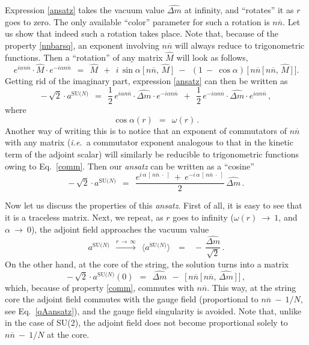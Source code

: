\documentclass[12pt]{article}
\def\beq{\begin{equation}}
\def\eeq{\end{equation}}
\newcommand{\ov}{\overline}
\newcommand{\aN}{a^\text{SU($N$)}}
\newcommand{\nnbar}{n\ov{n}}
\newcommand{\dm}{\hat{{\scriptstyle \Delta} m}}
\newcommand{\ie}{{\it i.e.}~}
\newcommand{\ansatz}{{\it ansatz} }
\begin{document}
	Expression \eqref{ansatz} takes the vacuum value $ \dm $ at infinity, and 
	``rotates'' it as $ r $ goes to zero.
	The only available ``color'' parameter for such a rotation is $ \nnbar $.
	Let us show that indeed such a rotation takes place.
	Note that, because of the property \eqref{nnbarsq}, an exponent involving $ \nnbar $
	will always reduce to trigonometric functions.
	Then a ``rotation'' of any matrix $ \hat{M} $ will look as follows,
\beq
	e^{i \alpha \nnbar} \cdot \hat{M} \cdot e^{- i \alpha \nnbar}    ~~=~~
	\hat{M}  ~~+~~  i\, \sin \alpha \: \big[\, \nnbar,\, \hat{M} \,\big]
	~~-~~  ( 1 ~-~ \cos \alpha )\, \Big[\, \nnbar\, \big[\, \nnbar,\, \hat{M} \,\big] \,\Big].
\eeq
	Getting rid of the imaginary part, expression \eqref{ansatz} can then be written as
\beq
\label{rotation}
	-\, \sqrt{2} \cdot \aN    ~~=~~    
	\frac{1}{2}\, e^{i \alpha \nnbar} \cdot \dm \cdot e^{- i \alpha \nnbar}  ~~+~~
	\frac{1}{2}\, e^{- i \alpha \nnbar} \cdot \dm \cdot e^{i \alpha \nnbar}\,,
\eeq
	where 
\beq
	\cos\alpha(r)    ~~=~~    \omega(r)\,.
\eeq
	Another way of writing this is to notice that an exponent of commutators of $ \nnbar $
	with any matrix (\ie a commutator exponent analogous to that in the kinetic term
	of the adjoint scalar) will similarly be reducible to trigonometric functions owing
	to Eq.~\eqref{comm}. 
	Then our \ansatz can be written as a ``cosine''
\beq
	-\, \sqrt{2} \cdot \aN    ~~=~~
	\frac{ e^{ i\, \alpha\, [\, \nnbar \; \cdot \;] } 
	   ~+~ e^{ - i\, \alpha\, [\, \nnbar \; \cdot \;] } } { 2 }\, \dm\,.
\eeq

	Now let us discuss the properties of this {\it ansatz}. 
	First of all, it is easy to see that it is a traceless matrix.
	Next, we repeat, as $ r $ goes to infinity ($ \omega(r) ~\to~ 1$, and $ \alpha ~\to~ 0 $),
	the adjoint field approaches the vacuum value
\beq
	\aN    ~~\overset{r\,\to\,\infty}{\longrightarrow}~~    
	\langle \aN \rangle    \;~~=~~\;    -\, \frac{\dm}{\sqrt{2}}\,.
\eeq
	On the other hand, at the core of the string, the solution turns into a matrix
\beq
	-\, \sqrt{2} \cdot \aN(0)    ~~=~~    \dm  ~~-~~  \Big[\, \nnbar\, \big[\, \nnbar,\, \dm \,\big] \,\Big]\,,
\eeq
	which, because of property \eqref{comm}, commutes with $ \nnbar $.
	This way,  at the string core the adjoint field commutes with the gauge field 
	(proportional to $ \nnbar ~-~ 1/N $, see Eq.~\eqref{qAansatz}), 
	and the gauge field singularity is avoided.
	Note that, unlike in the case of SU(2), the adjoint field does not become proportional solely to $ \nnbar ~-~ 1/N $
	at the core.
\end{document}
